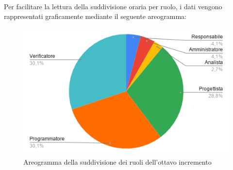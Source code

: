 \documentclass[../piano-di-progetto.tex]{subfiles}
\begin{document}
  Per facilitare la lettura della suddivisione oraria per ruolo, i dati vengono rappresentati graficamente mediante il seguente areogramma:
  \begin{figure}[H]
    \centering
    \includegraphics[width=12cm]{img/ruoli-8-incr.png}
    \caption{Areogramma della suddivisione dei ruoli dell'ottavo incremento}
    \label{fig:ore-ruolo-progettazione}
  \end{figure}
\end{document}
